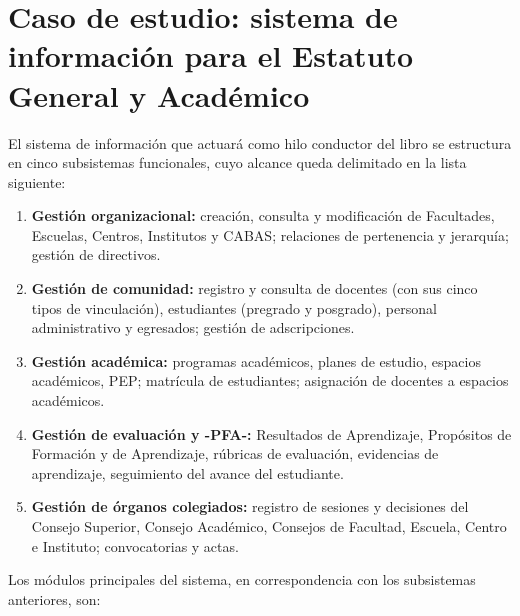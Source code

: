 \section{Caso de estudio: sistema de información para el Estatuto
  General y Académico}
\label{sec:caso-estudio}

El sistema de información que actuará como hilo conductor del libro se
estructura en cinco subsistemas funcionales, cuyo alcance queda delimitado
en la lista siguiente:

\begin{enumerate}[label=\textbf{SS-\arabic*.}]
  \item \textbf{Gestión organizacional:} creación, consulta y modificación
    de Facultades, Escuelas, Centros, Institutos y CABAS; relaciones de
    pertenencia y jerarquía; gestión de directivos.
  \item \textbf{Gestión de comunidad:} registro y consulta de docentes (con
    sus cinco tipos de vinculación), estudiantes (pregrado y posgrado),
    personal administrativo y egresados; gestión de adscripciones.
  \item \textbf{Gestión académica:} programas académicos, planes de estudio,
    espacios académicos, PEP; matrícula de estudiantes; asignación de
    docentes a espacios académicos.
  \item \textbf{Gestión de evaluación y -PFA-:} Resultados de Aprendizaje,
    Propósitos de Formación y de Aprendizaje, rúbricas de evaluación,
    evidencias de aprendizaje, seguimiento del avance del estudiante.
  \item \textbf{Gestión de órganos colegiados:} registro de sesiones y
    decisiones del Consejo Superior, Consejo Académico, Consejos de Facultad,
    Escuela, Centro e Instituto; convocatorias y actas.
\end{enumerate}

\noindent
Los módulos principales del sistema, en correspondencia con los subsistemas
anteriores, son:

